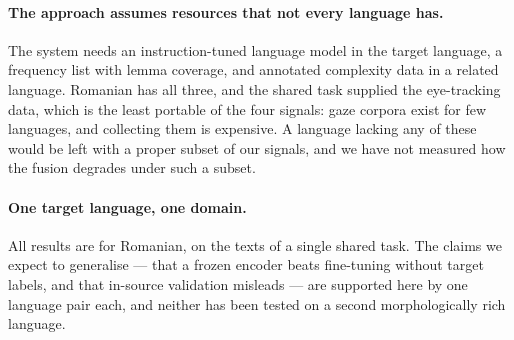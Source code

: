\paragraph{The approach assumes resources that not every language has.}
The system needs an instruction-tuned language model in the target
language, a frequency list with lemma coverage, and annotated
complexity data in a related language. Romanian has all three, and the
shared task supplied the eye-tracking data, which is the least portable
of the four signals: gaze corpora exist for few languages, and
collecting them is expensive. A language lacking any of these would be
left with a proper subset of our signals, and we have not measured how
the fusion degrades under such a subset.

\paragraph{One target language, one domain.}
All results are for Romanian, on the texts of a single shared task.
The claims we expect to generalise --- that a frozen encoder beats
fine-tuning without target labels, and that in-source validation
misleads --- are supported here by one language pair each, and neither
has been tested on a second morphologically rich language.
